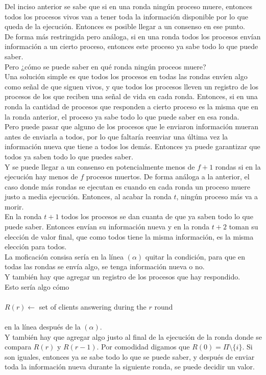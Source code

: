 \documentclass[12pt,a4paper]{report}
\begin{document}
\begin{enumerate}
{\begin{enumerate} [label = \alph*)]
{				Del inciso anterior se sabe que si en una ronda ningún proceso muere,
				entonces todos los procesos vivos van a tener toda la información
				disponible por lo que queda de la ejecución. Entonces es posible llegar
				a un consenso en ese punto.\\
				De forma más restringida pero análoga, si en una ronda todos los procesos
				envían información a un cierto proceso, entonces este proceso ya sabe
				todo lo que puede saber.\\
				Pero ¿cómo se puede saber en qué ronda ningún proceos muere?\\
				Una solución simple es que todos los procesos en todas las rondas envíen
				algo como señal de que siguen vivos, y que todos los procesos lleven
				un registro de los procesos de los que reciben una señal de vida en cada ronda.
				Entonces, si en una ronda la cantidad de procesos que responden a cierto proceso
				es la misma que en la ronda anterior, el proceso ya sabe todo
				lo que puede saber en esa ronda.\\
				Pero puede pasar que alguno de los procesos que le enviaron información
				mueran antes de enviarla a todos, por lo que faltaría reenviar una
				última vez la información nueva que tiene a todos los demás. Entonces ya
				puede garantizar que todos ya saben todo lo que puedes saber.\\
				Y se puede llegar a un consenso en potencialmente menos de $f+1$ rondas
				si en la ejecución hay menos de $f$ procesos muertos.
				De forma análoga a la anterior, el caso donde más rondas se ejecutan es
				cuando en cada ronda un proceso muere justo a media ejecución. Entonces,
				al acabar la ronda $t$, ningún proceso más va a morir.\\
				En la ronda $t+1$ todos los procesos se dan cuanta de que ya saben todo
				lo que puede saber. Entonces envían su información nueva y en la ronda
				$t+2$ toman su elección de valor final, que como todos tiene la misma
				información, es la misma elección para todos.\\
				La moficación consisa sería en la línea $(\alpha)$ quitar la condición,
				para que en todas las rondas se envía algo, se tenga información nueva o no.\\
				Y también hay que agregar un registro de los procesos que hay respondido.\\
				Esto sería algo cómo
				\\\\$R(r) \leftarrow$ set of clients answering during the $r$ round\\\\
				en la línea después de la $(\alpha)$.\\
				Y también hay que agregar algo justo al final de la ejecución de la ronda
				donde se compara $R(r)$ y $R(r-1)$. Por comodidad digamos que $R(0) = \Pi \setminus \{i\}$.
				Si son iguales, entonces ya se sabe
				todo lo que se puede saber, y después de enviar toda la información nueva
				durante la siguiente ronda, se puede decidir un valor.\\

}
\end{enumerate}}
\end{enumerate}
\end{document}
